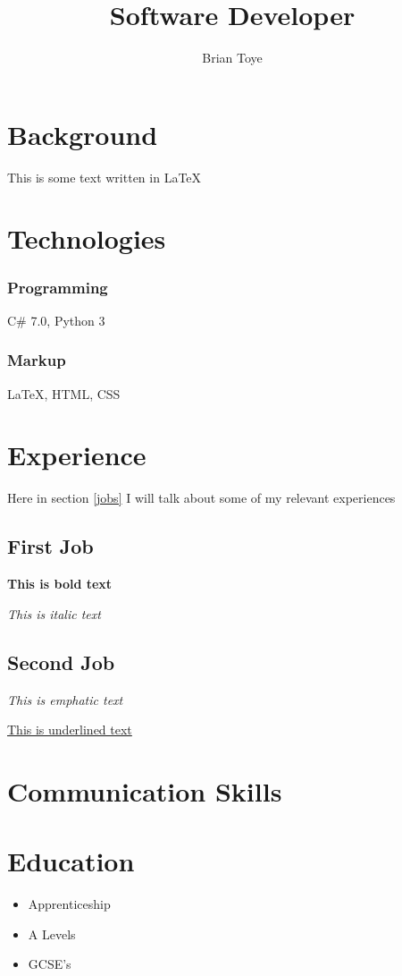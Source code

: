 \documentclass{article}
\author{Brian Toye}
\title{Software Developer}
\begin{document}
\maketitle

\section{Background}

This is some text written in {\LaTeX}

\section{Technologies}

\subsubsection{Programming}
C\# 7.0, Python 3

\subsubsection{Markup}
{\LaTeX}, HTML, CSS

\section{Experience\label{jobs}}

Here in section \ref{jobs} I will talk about some of my relevant experiences

\subsection{First Job}

\textbf {This is bold text}

\textit {This is italic text}
\subsection{Second Job}

\emph{This is emphatic text}

\underline{This is underlined text}

\section{Communication Skills}

\section{Education}

\begin{itemize}
\item Apprenticeship
\item A Levels
\item GCSE's
\end{itemize}
\end{document}
